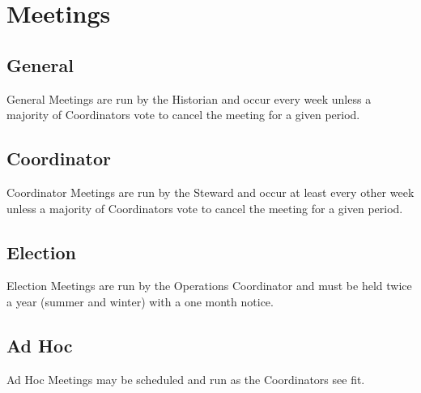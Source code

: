 \chapter{Meetings}

\section{General}\label{sec:general_meetings}
General Meetings are run by the Historian and occur every week unless a majority of Coordinators vote to cancel the meeting for a given period.

\section{Coordinator}\label{sec:coordinator_meetings}
Coordinator Meetings are run by the Steward and occur at least every other week unless a majority of Coordinators vote to cancel the meeting for a given period.

\section{Election}\label{sec:election_meeting}
Election Meetings are run by the Operations Coordinator and must be held twice a year (summer and winter) with a one month notice.

\section{Ad Hoc}\label{sec:ad_hoc}
Ad Hoc Meetings may be scheduled and run as the Coordinators see fit.
